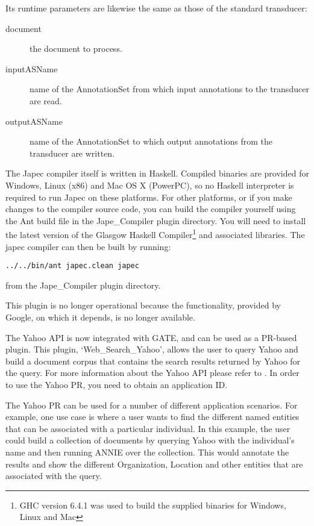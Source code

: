 Its runtime parameters are likewise the same as those of the standard
transducer:
\begin{description}
\item[document] the document to process.
\item[inputASName] name of the AnnotationSet from which input annotations to
the transducer are read.
\item[outputASName] name of the AnnotationSet to which output annotations from
the transducer are written.
\end{description}

The Japec compiler itself is written in Haskell.  Compiled binaries are
provided for Windows, Linux (x86) and Mac OS X (PowerPC), so no Haskell
interpreter is required to run Japec on these platforms.  For other platforms,
or if you make changes to the compiler source code, you can build the compiler
yourself using the Ant build file in the Jape\_Compiler plugin directory.  You
will need to install the latest version of the Glasgow Haskell
Compiler\footnote{GHC version 6.4.1 was used to build the supplied binaries for
Windows, Linux and Mac} and associated libraries.  The japec compiler can then
be built by running:
\begin{verbatim}
../../bin/ant japec.clean japec
\end{verbatim}
from the Jape\_Compiler plugin directory.


This plugin is no longer operational because the functionality, provided by
Google, on which it depends, is no longer available.


The Yahoo API is now integrated with GATE, and can be used as a PR-based
plugin.  This plugin, `Web\_Search\_Yahoo', allows the user to query Yahoo and
build a document corpus that contains the search results returned by Yahoo for
the query.  For more information about the Yahoo API please refer to
. In order to use the Yahoo
PR, you need to obtain an application ID.

The Yahoo PR can be used for a number of different application scenarios. For
example, one use case is where a user wants to find the different named
entities that can be associated with a particular individual. In this example,
the user could build a collection of documents by querying Yahoo with the
individual's name and then running ANNIE over the collection. This would
annotate the results and show the different Organization, Location and other
entities that are associated with the query.

